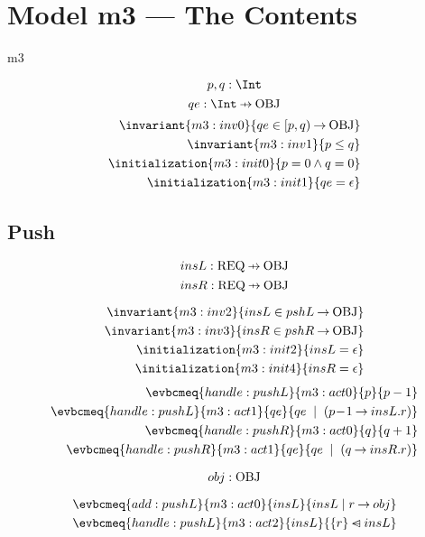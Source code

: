 \documentclass[12pt]{amsart}
\newcommand{\REQ}{\text{REQ}}
\begin{document}
\section{Model m3 --- The Contents}
\begin{machine}{m3}

  \newset{\OBJ}
  \[ \variable{ p,q : \Int } \]
  \[ \variable{ qe : \Int \pfun \OBJ } \]
  \begin{align}
    \invariant{m3:inv0}{ qe \in \intervalR{p}{q} \tfun \OBJ } \\
    \invariant{m3:inv1}{ p \le q } \\
    \initialization{m3:init0}{ p = 0 \land q = 0} \\
    \initialization{m3:init1}{ qe = \emptyfun }
  \end{align}
  \subsection{Push}
    \[\variable{insL : \REQ \pfun \OBJ} \]
    \[\variable{insR : \REQ \pfun \OBJ} \]
  \begin{description}
  \end{description}
  \begin{align}
    \invariant{m3:inv2}{ insL \in pshL \tfun \OBJ } \\
    \invariant{m3:inv3}{ insR \in pshR \tfun \OBJ } \\
    \initialization{m3:init2}{ insL = \emptyfun } \\
    \initialization{m3:init4}{ insR = \emptyfun }
  \end{align}
  \begin{align}
    \evbcmeq{handle:pushL}{m3:act0}{p}{p - 1} \\
    \evbcmeq{handle:pushL}{m3:act1}{qe}{ qe \2| (p \0- 1 \fun insL.r)} \\
    \evbcmeq{handle:pushR}{m3:act0}{q}{q + 1} \\
    \evbcmeq{handle:pushR}{m3:act1}{qe}{ qe \2| (q \fun insR.r)} 
  \end{align}
  
  \[ \param{add:pushL}{ obj : \OBJ } \]

  \begin{align}
    \evbcmeq{add:pushL}{m3:act0}
      {insL}{ insL \1| r \fun obj } \\
    \evbcmeq{handle:pushL}{m3:act2}
      {insL}{ \{ r \} \domsub insL }
  \end{align}


\end{machine}
\end{document}
